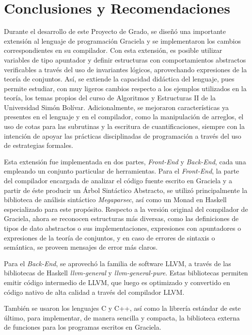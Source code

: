 \chapter*{Conclusiones y Recomendaciones}
\label{conclusiones}

Durante el desarrollo de este Proyecto de Grado, se diseñó una importante
extensión al lenguaje de programación Graciela y se implementaron los cambios
correspondientes en su compilador. Con esta extensión, es posible utilizar
variables de tipo apuntador y definir estructuras con comportamientos abstractos
verificables a través del uso de invariantes lógicos, aprovechando expresiones
de la teoría de conjuntos. Así, se extiende la capacidad didáctica del lenguaje,
pues permite estudiar, con muy ligeros cambios respecto a los ejemplos
utilizados en la teoría, los temas propios del curso de Algoritmos y Estructuras
II de la Universidad Simón Bolívar. Adicionalmente, se mejoraron características
ya presentes en el lenguaje y en el compilador, como la manipulación de
arreglos, el uso de cotas para las subrutinas y la escritura de
cuantificaciones, siempre con la intención de apoyar las prácticas disciplinadas
de programación a través del uso de estrategias formales.

Esta extensión fue implementada en dos partes, \textit{Front-End} y
\textit{Back-End}, cada una empleando un conjunto particular de herramientas.
Para el \textit{Front-End}, la parte del compilador encargada de analizar el
código fuente escrito en Graciela y a partir de éste producir un Árbol
Sintáctico Abstracto, se utilizó principalmente la biblioteca de análisis
sintáctico \textit{Megaparsec}, así como un Monad en Haskell especializado para
este propósito. Respecto a la versión original del compilador de Graciela, ahora
se reconocen estructuras más diversas, como las definiciones de tipos de dato
abstractos o sus implementaciones, expresiones con apuntadores o expresiones de
la teoría de conjuntos, y en caso de errores de sintaxis o semántica, se proveen
mensajes de error más claros.

Para el \textit{Back-End}, se aprovechó la familia de software LLVM, a través de
las bibliotecas de Haskell \textit{llvm-general} y \textit{llvm-general-pure}.
Estas bibliotecas permiten emitir código intermedio de LLVM, que luego es
optimizado y convertido en código nativo de alta calidad a través del compilador
LLVM. 

También se usaron los lenguajes C y C++, así como la librería estándar de este
último, para implementar, de manera sencilla y compacta, la biblioteca externa
de funciones para los programas escritos en Graciela.

